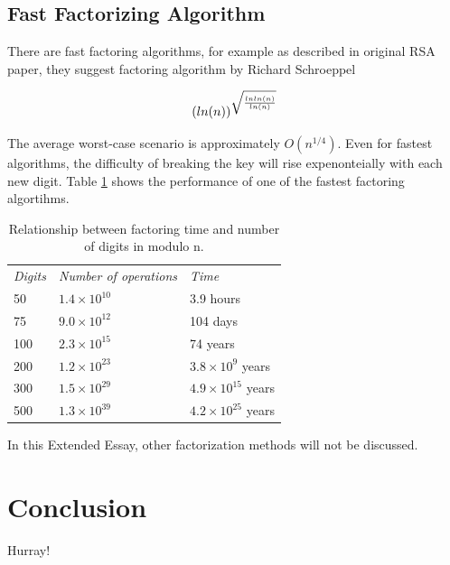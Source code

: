 \documentclass[a4paper, 12pt]{article}
\begin{document}
\subsection{Fast Factorizing Algorithm}
\label{bsec:fast}

There are fast factoring algorithms, for example as described in original RSA paper\cite{rsapaper},
they suggest factoring algorithm by Richard Schroeppel

\begin{equation}
  (ln(n))^{\sqrt{\frac{lnln(n)}{ln(n)}}}\\
  \end{equation}

The average worst-case scenario is approximately $O(n^{1/4})$. Even for fastest algorithms, the difficulty
of breaking the key will rise expenonteially with each new digit. Table \ref{table:rsa} shows the performance of one of the fastest factoring algortihms.

\begin{table}
  \begin{center}
    \begin{tabular}{l l l}
    \textit{Digits} & \textit{Number of operations} & \textit{Time}\\
    50 & $1.4 \times 10^{10}$ & 3.9 hours\\
    75 & $9.0 \times 10^{12}$ & 104 days\\
    100 & $2.3 \times 10^{15}$ & 74 years\\
    200 & $1.2 \times 10^{23}$ & $3.8 \times 10^9$ years\\
    300 & $1.5 \times 10^{29}$ & $4.9 \times 10^{15}$ years\\
    500 & $1.3 \times 10^{39}$ & $4.2 \times 10^{25}$ years\\
    \end{tabular}
  \caption{Relationship between factoring time and number of digits in modulo n.\cite{rsapaper}}
  \label{table:rsa}
  \end{center}
  \end{table}

In this Extended Essay, other factorization methods will not be discussed.

\newpage

\section{Conclusion}

Hurray!

\newpage
\singlespace
\appendix
\end{document}
